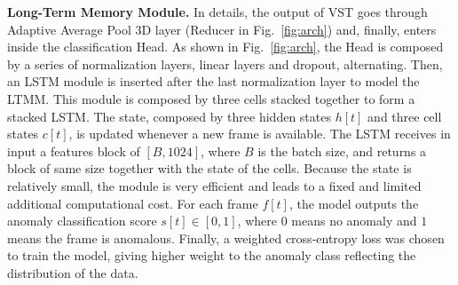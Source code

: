 \noindent\textbf{Long-Term Memory Module.}
In details, the output of VST goes through Adaptive Average Pool 3D layer (Reducer in Fig.~\ref{fig:arch}) and, finally, enters inside the classification Head.
As shown in Fig.~\ref{fig:arch}, the Head is composed by a series of normalization layers, linear layers and dropout, alternating. 
Then, an LSTM module is inserted after the last normalization layer to model the LTMM.
This module is composed by three cells stacked together to form a stacked LSTM.
The state, composed by three hidden states $h[t]$ and three cell states $c[t]$, is updated whenever a new frame is available.
The LSTM receives in input a features block of $[B, 1024]$, where $B$ is the batch size, and returns a block of same size together with the state of the cells.
Because the state is relatively small, the module is very efficient and leads to a fixed and limited additional computational cost.
For each frame $f[t]$, the model outputs the anomaly classification score $s[t] \in [0,1]$, where $0$ means no anomaly and $1$ means the frame is anomalous.
Finally, a weighted cross-entropy loss was chosen to train the model, giving higher weight to the anomaly class reflecting the distribution of the data.


